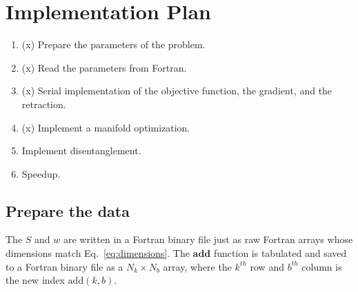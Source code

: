 \documentclass[a4paper, 12pt]{article}
\begin{document}
\section{Implementation Plan}%
\label{sec:Implementation Plan}

\begin{enumerate}
    \item (x) Prepare the parameters of the problem.
    \item (x) Read the parameters from Fortran.
    \item (x) Serial implementation of the objective function, the gradient, and the retraction.
    \item (x) Implement a manifold optimization.
    \item Implement disentanglement.
    \item Speedup.
\end{enumerate}

\subsection{Prepare the data}%
\label{sub:Prepare the data}

The $S$ and $w$ are written in a Fortran binary file just as raw Fortran arrays
whose dimensions match Eq.~\ref{eq:dimensions}. The $\mathbf{add}$ function is 
tabulated and saved to a Fortran binary file as a $N_k \times N_b$ array, 
where the $k^{th}$ row and $b^{th}$ column is the new index $\mathrm{add}(k, b)$.
\end{document}
